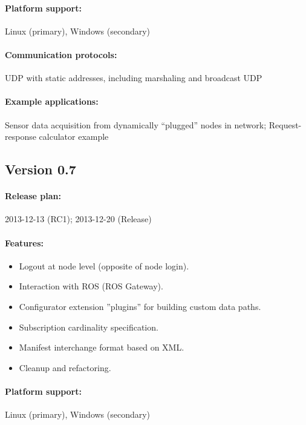 \paragraph{Platform support:} Linux (primary), Windows (secondary)
\paragraph{Communication protocols:} UDP with static addresses, including marshaling and broadcast UDP
\paragraph{Example applications:} Sensor data acquisition from dynamically ``plugged'' nodes in network; Request-response calculator example



\subsection{Version 0.7}

\paragraph{Release plan:} 2013-12-13 (RC1); 2013-12-20 (Release)

\paragraph{Features:}
\begin{itemize}
	\item Logout at node level (opposite of node login).
	\item Interaction with ROS (ROS Gateway).
	\item Configurator extension ''plugins'' for building custom data paths.
	\item Subscription cardinality specification.
	\item Manifest interchange format based on XML.
	\item Cleanup and refactoring.
\end{itemize}

\paragraph{Platform support:} Linux (primary), Windows (secondary)
